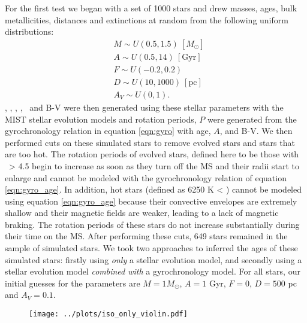 For the first test we began with a set of 1000 stars and drew masses, ages,
bulk metallicities, distances and extinctions at random from the following
uniform distributions:
\begin{eqnarray}
& M \sim U(0.5, 1.5)~[M_\odot] \\
& A \sim U(0.5, 14)\mathrm{~[Gyr]} \\
& F \sim U(-0.2, 0.2) \\
& D \sim U(10, 1000)~\mathrm{[pc]} \\
& A_V \sim U(0, 1).
\end{eqnarray}
\teff, \logg, \fhat, {\bf \mx}, \pmega\ and B-V were then generated using
these stellar parameters with the MIST stellar evolution models \citep{choi}
and rotation periods, $P$ were generated from the gyrochronology relation in
equation \ref{eqn:gyro} with age, $A$, and B-V.
We then performed cuts on these simulated stars to remove evolved stars and
stars that are too hot.
The rotation periods of evolved stars, defined here to be those with \logg\ >
4.5 begin to increase as soon as they turn off the MS and their radii start to
enlarge and cannot be modeled with the gyrochronology relation of equation
\ref{eqn:gyro_age}.
In addition, hot stars (defined as 6250 K < \teff) cannot be modeled using
equation \ref{eqn:gyro_age} because their convective envelopes are extremely
shallow and their magnetic fields are weaker, leading to a lack of magnetic
braking.
The rotation periods of these stars do not increase substantially during their
time on the MS.
After performing these cuts, 649  stars remained in the
sample of simulated stars.
We took two approaches to inferred the ages of these simulated stars: firstly
using {\it only} a stellar evolution model, and secondly using a stellar
evolution model {\it combined with} a gyrochronology model.
For all stars, our initial guesses for the parameters are $M = 1M_\odot$, $A =
1$ Gyr, $F = 0$, $D = 500$ pc and $A_V = 0.1$.

\begin{figure}
  \caption{
}
  \centering
    \texttt{[image: ../plots/iso\_only\_violin.pdf]}
\label{fig:clusters}
\end{figure}


